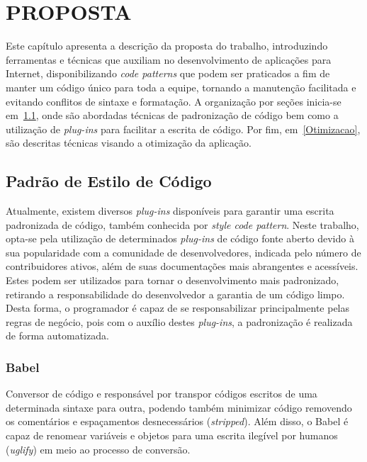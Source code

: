\chapter{PROPOSTA}
\label{Proposta}

Este capítulo apresenta a descrição da proposta do trabalho, introduzindo ferramentas e técnicas que auxiliam no desenvolvimento de aplicações para Internet, disponibilizando \textit{code patterns} que podem ser praticados a fim de manter um código único para toda a equipe, tornando a manutenção facilitada e evitando conflitos de sintaxe e formatação. A organização por seções inicia-se em~\ref{CodePattern}, onde são abordadas técnicas de padronização de código bem como a utilização de \textit{plug-ins} para facilitar a escrita de código. Por fim, em~\ref{Otimizacao}, são descritas técnicas visando a otimização da aplicação.

\section{Padrão de Estilo de Código}
\label{CodePattern}

Atualmente, existem diversos \textit{plug-ins} disponíveis para garantir uma escrita padronizada de código, também conhecida por \textit{style code pattern}. Neste trabalho, opta-se pela utilização de determinados \textit{plug-ins} de código fonte aberto devido à sua popularidade com a comunidade de desenvolvedores, indicada pelo número de contribuidores ativos, além de suas documentações mais abrangentes e acessíveis. Estes podem ser utilizados para tornar o desenvolvimento mais padronizado, retirando a responsabilidade do desenvolvedor a garantia de um código limpo. Desta forma, o programador é capaz de se responsabilizar principalmente pelas regras de negócio, pois com o auxílio destes \textit{plug-ins}, a padronização é realizada de forma automatizada.

\subsection{Babel}
\label{SubBabel}

Conversor de código e responsável por transpor códigos escritos de uma determinada sintaxe para outra, podendo também minimizar código removendo os comentários e espaçamentos desnecessários (\textit{stripped}). Além disso, o Babel é capaz de renomear variáveis e objetos para uma escrita ilegível por humanos (\textit{uglify}) em meio ao processo de conversão.

